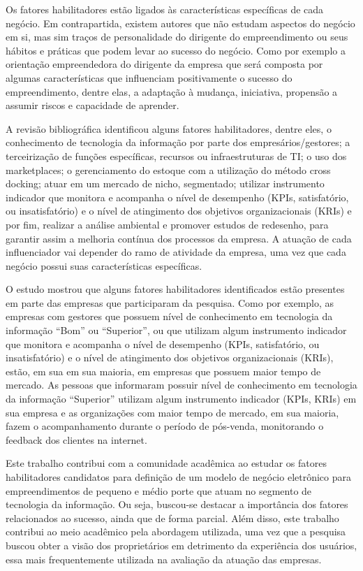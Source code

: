 Os fatores habilitadores estão ligados às características específicas de cada negócio. Em contrapartida, existem autores que não estudam aspectos do negócio em si, mas sim traços de personalidade do dirigente do empreendimento ou seus hábitos e práticas que podem levar ao sucesso do negócio. Como por exemplo a orientação empreendedora do dirigente da empresa que será composta por algumas características que influenciam positivamente o sucesso do empreendimento, dentre elas, a adaptação à mudança, iniciativa, propensão a assumir riscos e capacidade de aprender.

A revisão bibliográfica identificou alguns fatores habilitadores, dentre eles, o conhecimento de tecnologia da informação por parte dos empresários/gestores; a terceirização de funções específicas, recursos ou infraestruturas de TI; o uso dos marketplaces; o gerenciamento do estoque com a utilização do método cross docking; atuar em um mercado de nicho, segmentado; utilizar instrumento indicador que monitora e acompanha o nível de desempenho (KPIs, satisfatório, ou insatisfatório) e o nível de atingimento dos objetivos organizacionais (KRIs) e por fim, realizar a análise ambiental e promover estudos de redesenho, para garantir assim a melhoria contínua dos processos da empresa. A atuação de cada influenciador vai depender do ramo de atividade da empresa, uma vez que cada negócio possui suas características específicas. 

O estudo mostrou que alguns fatores habilitadores identificados estão presentes em parte das empresas que participaram da pesquisa. Como por exemplo, as empresas com gestores que possuem  nível de conhecimento em tecnologia da informação “Bom” ou “Superior”, ou que utilizam algum instrumento indicador que monitora e acompanha o nível de desempenho (KPIs, satisfatório, ou insatisfatório) e o nível de atingimento dos objetivos organizacionais (KRIs), estão, em sua em sua maioria, em empresas que possuem maior tempo de mercado. As pessoas que informaram possuir nível de conhecimento em tecnologia da informação “Superior” utilizam algum instrumento indicador (KPIs, KRIs) em sua empresa e as organizações com maior tempo de mercado, em sua maioria, fazem o acompanhamento durante o período de pós-venda, monitorando o feedback dos clientes na internet.

Este trabalho contribui com a comunidade acadêmica ao estudar os fatores habilitadores candidatos para definição de um modelo de negócio eletrônico para empreendimentos de pequeno e médio porte que atuam no segmento de tecnologia da informação. Ou seja, buscou-se destacar a importância dos fatores relacionados ao sucesso, ainda que de forma parcial. Além disso, este trabalho contribui ao meio acadêmico pela abordagem utilizada, uma vez que a pesquisa buscou obter a visão dos proprietários em detrimento da experiência dos usuários, essa mais frequentemente utilizada na avaliação da atuação das empresas.


